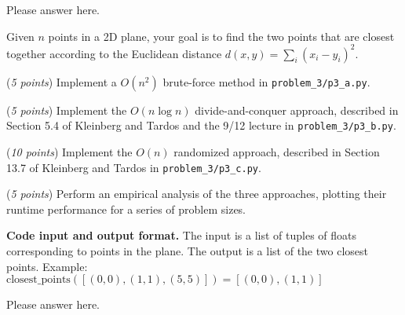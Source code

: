 \documentclass{hw_template}
\newcommand{\io}{\textbf{Code input and output format.} }
\begin{document}
\begin{solution}
Please answer here.
\end{solution}

\newpage


\newcommand{\rank}{\textnormal{rank}}
\newcommand{\Colon}{:}
\newcommand{\dotdot}{..}
\newcommand{\numinv}{\textrm{NI}}
\newcommand{\numlargeinv}{\textrm{NLI}}

\begin{problem}
  Given $n$ points in a 2D plane, your goal is to find the two points that are closest together
  according to the Euclidean distance $d(x,y) = \sum_i (x_i - y_i)^2$.

  \begin{subproblem}
    (\textit{5 points}) Implement a $O(n^2)$ brute-force method in \texttt{problem\_3/p3\_a.py}.
  \end{subproblem}

  \begin{subproblem}
    (\textit{5 points}) Implement the $O(n \log n)$ divide-and-conquer approach,
    described in Section 5.4 of Kleinberg and Tardos and the 9/12 lecture in \texttt{problem\_3/p3\_b.py}.
  \end{subproblem}

  \begin{subproblem}
    (\textit{10 points}) Implement the $O(n)$ randomized approach,
    described in Section 13.7 of Kleinberg and Tardos in \texttt{problem\_3/p3\_c.py}.
  \end{subproblem}

  \begin{subproblem}
      (\textit{5 points})
      Perform an empirical analysis of the three approaches,
      plotting their runtime performance for a series of problem sizes.
  \end{subproblem}

  \io The input is a list of tuples of floats corresponding to points in the plane.
  The output is a list of the two closest points.
  Example: $\text{closest\_points}([(0,0), (1,1), (5,5)]) = [(0,0), (1,1)]$
\end{problem}

\begin{solution}
Please answer here.
\end{solution}
\newpage
\end{document}
